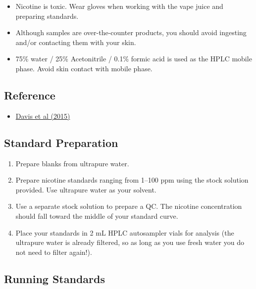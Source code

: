 \documentclass[]{tufte-book}
\providecommand{\tightlist}{%
  \setlength{\itemsep}{0pt}\setlength{\parskip}{0pt}}
\begin{document}
\begin{itemize}
\tightlist
\item
  Nicotine is toxic. Wear gloves when working with the vape juice and preparing standards.\\
\item
  Although samples are over-the-counter products, you should avoid ingesting and/or contacting them with your skin.
\item
  75\% water / 25\% Acetonitrile / 0.1\% formic acid is used as the HPLC mobile phase. Avoid skin contact with mobile phase.
\end{itemize}

\hypertarget{reference-1}{%
\subsection*{Reference}\label{reference-1}}

\begin{itemize}
\tightlist
\item
  \href{https://www.ncbi.nlm.nih.gov/pmc/articles/PMC4892702/}{Davis et al (2015)}
\end{itemize}

\hypertarget{standard-preparation-1}{%
\subsection{Standard Preparation}\label{standard-preparation-1}}

\begin{enumerate}
\def\labelenumi{\arabic{enumi}.}
\tightlist
\item
  Prepare blanks from ultrapure water.
\item
  Prepare nicotine standards ranging from 1--100 ppm using the stock solution provided. Use ultrapure water as your solvent.
\item
  Use a separate stock solution to prepare a QC. The nicotine concentration should fall toward the middle of your standard curve.
\item
  Place your standards in 2 mL HPLC autosampler vials for analysis (the ultrapure water is already filtered, so as long as you use fresh water you do not need to filter again!).
\end{enumerate}

\hypertarget{running-standards}{%
\subsection{Running Standards}\label{running-standards}}
\end{document}
